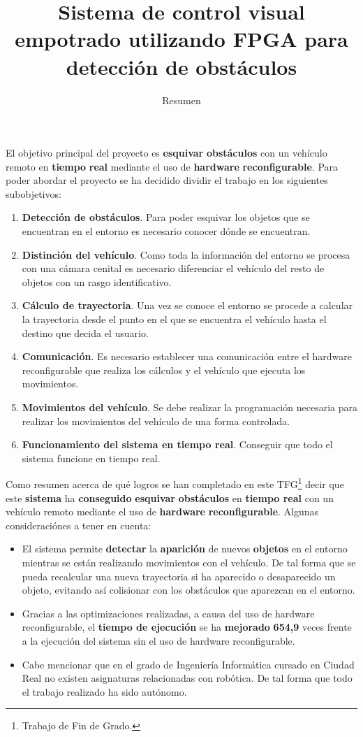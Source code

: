 \documentclass[a4paper,12pt]{article}
\title{Sistema de control visual empotrado utilizando FPGA para detección de obstáculos}
\author{Resumen}
\begin{document}
\maketitle

El objetivo principal del proyecto es \textbf{esquivar} \textbf{obstáculos} con un vehículo remoto en \textbf{tiempo} \textbf{real} mediante el uso de \textbf{hardware} \textbf{reconfigurable}. Para poder abordar el proyecto se ha decidido dividir el trabajo en los siguientes subobjetivos:

\begin{enumerate}
\item \textbf{Detección de obstáculos}. Para poder esquivar los objetos que se encuentran en el entorno es necesario conocer dónde se encuentran.
\item \textbf{Distinción del vehículo}. Como toda la información del entorno se procesa con una cámara cenital es necesario diferenciar el vehículo del resto de objetos con un rasgo identificativo.
\item \textbf{Cálculo de trayectoria}. Una vez se conoce el entorno se procede a calcular la trayectoria desde el punto en el que se encuentra el vehículo hasta el destino que decida el usuario.
\item \textbf{Comunicación}. Es necesario establecer una comunicación entre el hardware reconfigurable que realiza los cálculos y el vehículo que ejecuta los movimientos.
\item \textbf{Movimientos del vehículo}. Se debe realizar la programación necesaria para realizar los movimientos del vehículo de una forma controlada.
\item \textbf{Funcionamiento del sistema en tiempo real}. Conseguir que todo el sistema funcione en tiempo real.
\end{enumerate}

Como resumen acerca de qué logros se han completado en este TFG\footnote{Trabajo de Fin de Grado.} decir que este \textbf{sistema} ha \textbf{conseguido} \textbf{esquivar} \textbf{obstáculos} en \textbf{tiempo real} con un vehículo remoto mediante el uso de \textbf{hardware} \textbf{reconfigurable}. Algunas consideraciónes a tener en cuenta:

\begin{itemize}
\item El sistema permite \textbf{detectar} la \textbf{aparición} de nuevos \textbf{objetos} en el entorno mientras se están realizando movimientos con el vehículo. De tal forma que se pueda recalcular una nueva trayectoria si ha aparecido o desaparecido un objeto, evitando así colisionar con los obstáculos que aparezcan en el entorno.
\item Gracias a las optimizaciones realizadas, a causa del uso de hardware reconfigurable, el \textbf{tiempo de ejecución} se ha \textbf{mejorado} \textbf{654,9} veces frente a la ejecución del sistema sin el uso de hardware reconfigurable.
\item Cabe mencionar que en el grado de Ingeniería Informática cursado en Ciudad Real no existen asignaturas relacionadas con robótica. De tal forma que todo el trabajo realizado ha sido autónomo.
\end{itemize}
\end{document}
